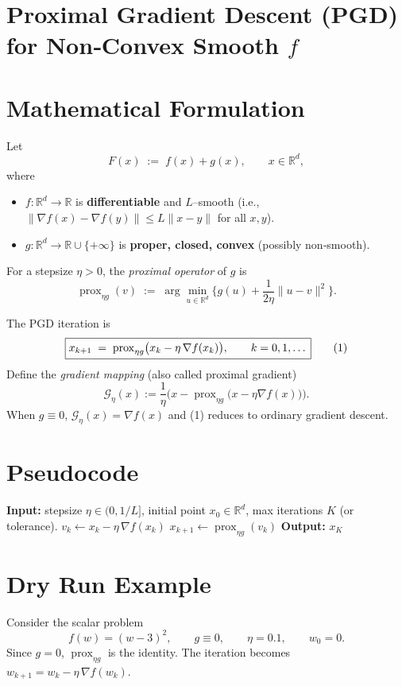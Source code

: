 \documentclass{article}
\newcommand{\prox}{\operatorname{prox}}
\newcommand{\grad}{\nabla}
\newcommand{\R}{\mathbb{R}}
\begin{document}
\section*{Proximal Gradient Descent (PGD) for Non‑Convex Smooth $f$}

\section*{Mathematical Formulation}
Let  
\[
F(x)\;:=\;f(x)+g(x),\qquad x\in\R^{d},
\]
where  

\begin{itemize}
\item $f:\R^{d}\to\R$ is \textbf{differentiable} and $L$–smooth (i.e., $\|\grad f(x)-\grad f(y)\|\le L\|x-y\|$ for all $x,y$).  
\item $g:\R^{d}\to\R\cup\{+\infty\}$ is \textbf{proper, closed, convex} (possibly non‑smooth).  
\end{itemize}

For a stepsize $\eta>0$, the \emph{proximal operator} of $g$ is
\[
\prox_{\eta g}(v)\;:=\;\arg\min_{u\in\R^{d}}\Big\{g(u)+\frac{1}{2\eta}\|u-v\|^{2}\Big\}.
\]

The PGD iteration is
\begin{equation}
\boxed{%
x_{k+1}\;=\;\prox_{\eta g}\!\big(x_{k}-\eta\,\grad f(x_{k})\big),\qquad k=0,1,\dots
}\tag{1}
\end{equation}
Define the \emph{gradient mapping} (also called proximal gradient) 
\[
\mathcal{G}_{\eta}(x):=\frac{1}{\eta}\Big(x-\prox_{\eta g}\!\big(x-\eta\grad f(x)\big)\Big).
\] 
When $g\equiv0$, $\mathcal{G}_{\eta}(x)=\grad f(x)$ and (1) reduces to ordinary gradient descent.

\section*{Pseudocode}
\begin{algorithm}[H]
\caption{Proximal Gradient Descent}
\begin{algorithmic}[1]
\State \textbf{Input:} stepsize $\eta\in(0,1/L]$, initial point $x_{0}\in\R^{d}$, max iterations $K$ (or tolerance).
    \State $v_{k}\gets x_{k}-\eta\,\grad f(x_{k})$ 
    \State $x_{k+1}\gets \prox_{\eta g}(v_{k})$ 
\EndFor
\State \textbf{Output:} $x_{K}$
\end{algorithmic}
\end{algorithm}

\section*{Dry Run Example}
Consider the scalar problem 
\[
f(w)=(w-3)^{2},\qquad g\equiv0,\qquad \eta=0.1,\qquad w_{0}=0.
\]
Since $g=0$, $\prox_{\eta g}$ is the identity. The iteration becomes $w_{k+1}=w_{k}-\eta\,\grad f(w_{k})$.
\end{document}
